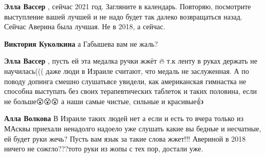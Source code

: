 \begin{itemize}
\begin{itemize}
 
\textbf{Элла Вассер} , сейчас 2021 год. Загляните в календарь. Повторяю,
посмотрите выступление вашей лучшей и не надо будет так далеко возвращаться
назад. Сейчас Аверина была лучшая. Не в 2018, а сейчас.

 
\textbf{Виктория Куколкина} а Габышева вам не жаль?

 
\textbf{Элла Вассер} , пусть ей эта медалка ручки жжёт 🔥 т.к ленту в руках
держать не научилась((( даже люди в Израиле считают, что медаль не заслуженная.
А по поводу допинга смешно слушать\Laughey[1.0][white] все увидели, как американская гимнастка не
способна выступать без своих терапевтических таблеток \Laughey[1.0][white]и таких половина, если
не больше😮😮😮 а наши самые чистые, сильные и красивые👍💪😍

 
\textbf{Алла Волкова} В Израиле таких людей нет а если и есть то вчера только
из МАсквы приехали ненадолго надоело уже слушать какие вы бедные и несчатные,
ей будет руки жечь? Пусть вам язык за такие слова жжет!!! Авериной в 2018
ничего не сожгло???тото руки из жопы с тех пор, достали уже.

 

\end{itemize}
\end{itemize}
